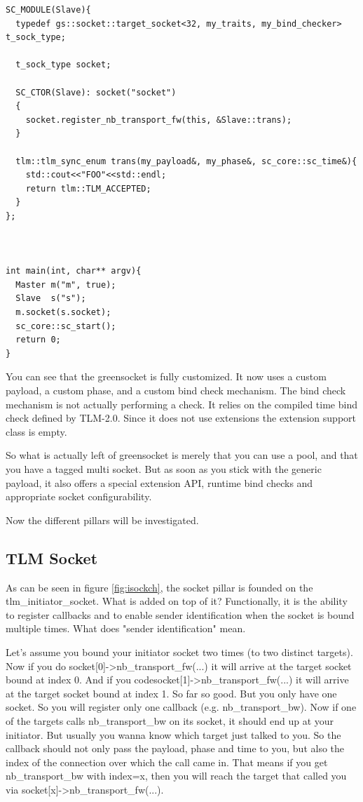 \documentclass[a4paper,10pt]{article}          %
\newcommand{\code}[1]{{\ttfamily#1}}
\begin{document}
\begin{lstlisting}
SC_MODULE(Slave){
  typedef gs::socket::target_socket<32, my_traits, my_bind_checker> t_sock_type;

  t_sock_type socket;

  SC_CTOR(Slave): socket("socket")
  {
    socket.register_nb_transport_fw(this, &Slave::trans);
  }

  tlm::tlm_sync_enum trans(my_payload&, my_phase&, sc_core::sc_time&){
    std::cout<<"FOO"<<std::endl;
    return tlm::TLM_ACCEPTED;
  }
};



int main(int, char** argv){
  Master m("m", true);
  Slave  s("s");
  m.socket(s.socket);
  sc_core::sc_start();
  return 0;
}
\end{lstlisting}

You can see that the greensocket is fully customized. It now uses a custom payload, a custom phase, and a custom bind check mechanism. The bind check mechanism is not actually performing a check. It relies on the compiled time bind check defined by TLM-2.0. Since it does not use extensions the extension support class is empty.

So what is actually left of greensocket is merely that you can use a pool, and that you have a tagged multi socket. But as soon as you stick with the generic payload, it also offers a special extension API, runtime bind checks and appropriate socket configurability.

Now the different pillars will be investigated.

\subsection{TLM Socket}

As can be seen in figure \ref{fig:isockch}, the socket pillar is founded on the \code{tlm\_initiator\_socket}.  What is added on top of it? Functionally, it is the ability to register callbacks and to enable sender identification when the socket is bound multiple times.
What does "sender identification" mean.

Let's assume you bound your initiator socket two times (to two distinct targets). Now if you do \code{socket[0]->nb\_transport\_fw(...)} it will arrive at the target socket bound at index 0. And if you code{socket[1]->nb\_transport\_fw(...)}  it will arrive at the target socket bound at index 1. So far so good. But you only have one socket. So you will register only one callback (e.g. \code{nb\_transport\_bw}). Now if one of the targets calls \code{nb\_transport\_bw} on its socket, it should end up at your initiator. But usually you wanna know which target just talked to you. So the callback should not only pass the payload, phase and time to you, but also the index of the connection over which the call came in. That means if you get \code{nb\_transport\_bw} with index=x, then you will reach the target that called you via \code{socket[x]->nb\_transport\_fw(...)}.
\end{document}
